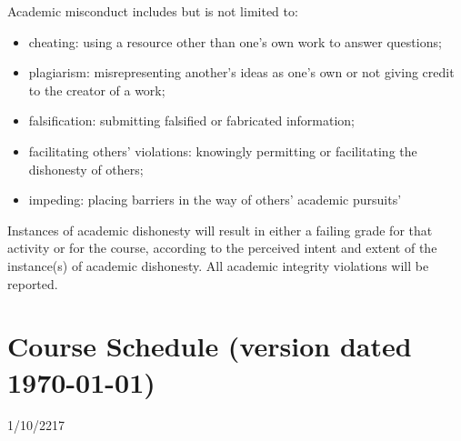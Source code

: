 \documentclass{tufte-handout}
\begin{document}
\begin{fullwidth}
Academic misconduct includes but is not limited to:

\begin{itemize}
	\item cheating: using a resource other than one's own work to answer questions;
	\item plagiarism: misrepresenting another's ideas as one's own or not giving credit to the creator of a work;
	\item falsification: submitting falsified or fabricated information;
	\item facilitating others' violations: knowingly permitting or facilitating the dishonesty of others;
	\item impeding: placing barriers in the way of others' academic pursuits'
\end{itemize}

Instances of academic dishonesty will result in either a failing grade for that activity or for the course, according to the perceived intent and extent of the instance(s) of academic dishonesty.
All academic integrity violations will be reported.





\newpage

\section{Course Schedule (version dated \today)}



  \setlength{\calwidth}{6.8in}
  \setlength{\calboxdepth}{0.3in}
  \begin{calendar}{1/10/22}{17}


 \calday[Monday]{\classday} %
  \calday[Tuesday]{\classday} %
\calday[Wednesday]{\classday}
  \calday[Thursday]{\classday} %
 \calday[Friday]{\classday} %
    \skipday\skipday %















\end{calendar}
\end{fullwidth}
\end{document}
